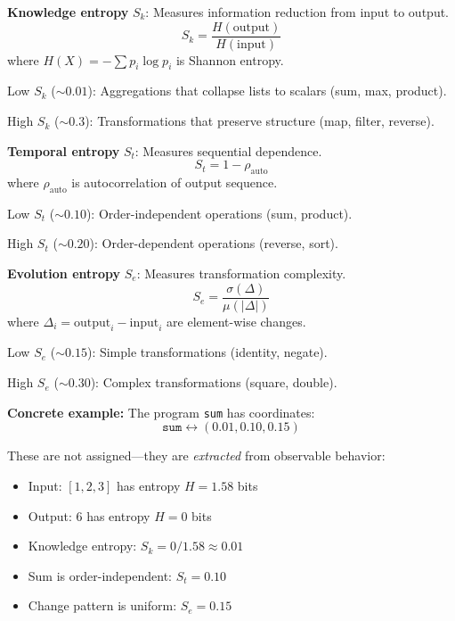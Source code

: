 \documentclass[twocolumn,10pt]{article}
\theoremstyle{definition}
\theoremstyle{remark}
\newcommand{\Sk}{S_k}
\newcommand{\St}{S_t}
\newcommand{\Se}{S_e}
\begin{document}
\vspace{0.2cm}
\noindent\textbf{Knowledge entropy} $\Sk$: Measures information reduction from input to output.
\begin{equation}
\Sk = \frac{H(\text{output})}{H(\text{input})}
\end{equation}
where $H(X) = -\sum p_i \log p_i$ is Shannon entropy.

Low $\Sk$ ($\sim 0.01$): Aggregations that collapse lists to scalars (sum, max, product).

High $\Sk$ ($\sim 0.3$): Transformations that preserve structure (map, filter, reverse).

\vspace{0.2cm}
\noindent\textbf{Temporal entropy} $\St$: Measures sequential dependence.
\begin{equation}
\St = 1 - \rho_{\text{auto}}
\end{equation}
where $\rho_{\text{auto}}$ is autocorrelation of output sequence.

Low $\St$ ($\sim 0.10$): Order-independent operations (sum, product).

High $\St$ ($\sim 0.20$): Order-dependent operations (reverse, sort).

\vspace{0.2cm}
\noindent\textbf{Evolution entropy} $\Se$: Measures transformation complexity.
\begin{equation}
\Se = \frac{\sigma(\Delta)}{\mu(|\Delta|)}
\end{equation}
where $\Delta_i = \text{output}_i - \text{input}_i$ are element-wise changes.

Low $\Se$ ($\sim 0.15$): Simple transformations (identity, negate).

High $\Se$ ($\sim 0.30$): Complex transformations (square, double).

\vspace{0.2cm}
\noindent\textbf{Concrete example:} The program \texttt{sum} has coordinates:
\begin{equation}
\texttt{sum} \leftrightarrow (0.01, 0.10, 0.15)
\end{equation}

These are not assigned—they are \textit{extracted} from observable behavior:
\begin{itemize}
\item Input: $[1,2,3]$ has entropy $H = 1.58$ bits
\item Output: $6$ has entropy $H = 0$ bits
\item Knowledge entropy: $\Sk = 0/1.58 \approx 0.01$
\item Sum is order-independent: $\St = 0.10$
\item Change pattern is uniform: $\Se = 0.15$
\end{itemize}
\end{document}
